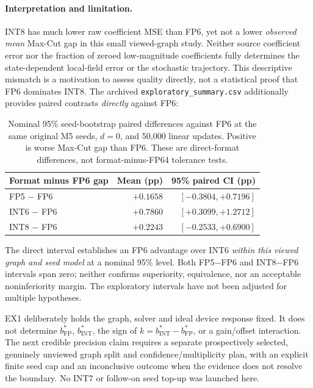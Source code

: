 \paragraph{Interpretation and limitation.}
INT8 has much lower raw coefficient MSE
than FP6, yet not a lower \emph{observed
mean} Max-Cut gap in this small viewed-graph
study. Neither source coefficient error nor
the fraction of zeroed low-magnitude
coefficients fully determines the
state-dependent local-field error or
the stochastic trajectory. This
descriptive mismatch is a motivation
to assess quality directly, not
a statistical proof that FP6 dominates
INT8. The archived
\texttt{exploratory\_summary.csv} additionally
provides paired contrasts \emph{directly}
against FP6:
\begin{table}[htbp]\centering\small
\begin{tabular}{@{}l rr@{}}\toprule
Format minus FP6 gap & Mean (pp) & 95\% paired CI (pp)\\\midrule
FP5 $-$ FP6 & $+0.1658$ & $[-0.3804,+0.7196]$\\
INT6 $-$ FP6 & $+0.7860$ & $[+0.3099,+1.2712]$\\
INT8 $-$ FP6 & $+0.2243$ & $[-0.2533,+0.6900]$\\\bottomrule
\end{tabular}
\caption{Nominal 95\% seed-bootstrap paired
differences against FP6 at the same original
M5 seeds, $d=0$, and 50,000 linear updates.
Positive is worse Max-Cut gap than FP6.
These are direct-format differences, not
format-minus-FP64 tolerance tests.}
\label{tab:ex1-direct}
\end{table}

The direct interval establishes an FP6 advantage
over INT6 \emph{within this viewed graph and
seed model} at a nominal 95\% level. Both
FP5$-$FP6 and INT8$-$FP6 intervals
span zero; neither confirms superiority,
equivalence, nor an acceptable noninferiority
margin. The exploratory intervals have not
been adjusted for multiple hypotheses.

EX1 deliberately holds the graph, solver
and ideal device response fixed.
It does not determine $b^*_{\mathrm{FP}}$,
$b^*_{\mathrm{INT}}$, the sign of
$k=b^*_{\mathrm{INT}}-b^*_{\mathrm{FP}}$,
or a gain/offset interaction.
The next credible precision claim
requires a separate prospectively
selected, genuinely unviewed graph
split and confidence/multiplicity
plan, with an explicit finite
seed cap and an inconclusive outcome
when the evidence does not resolve
the boundary. No INT7 or follow-on
seed top-up was launched here.
